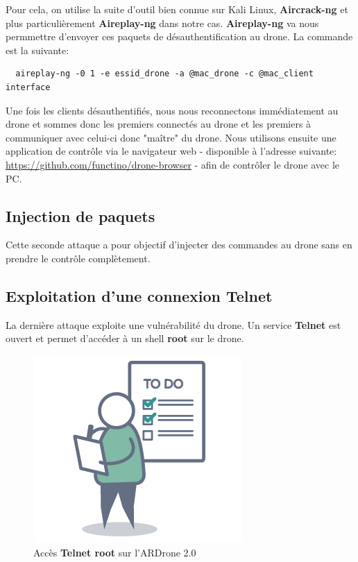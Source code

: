 Pour cela, on utilise la suite d'outil bien connue sur Kali Linux, \textbf{Aircrack-ng} et plus particulièrement \textbf{Aireplay-ng} dans notre cas. \textbf{Aireplay-ng} va nous permmettre d'envoyer ces paquets de désauthentification au drone.
La commande est la suivante:
\begin{verbatim}
  aireplay-ng -0 1 -e essid_drone -a @mac_drone -c @mac_client interface
\end{verbatim}


Une fois les clients désauthentifiés, nous nous reconnectons immédiatement au drone et sommes donc les premiers connectés au drone et les premiers à communiquer avec celui-ci donc "maître" du drone. Nous utilisons ensuite une application de contrôle via le navigateur web - disponible à l'adresse suivante: \url{https://github.com/functino/drone-browser} - afin de contrôler le drone avec le PC.

\subsection{Injection de paquets}
Cette seconde attaque a pour objectif d'injecter des commandes au drone sans en prendre le contrôle complètement.

\subsection{Exploitation d'une connexion Telnet}
La dernière attaque exploite une vulnérabilité du drone. Un service \textbf{Telnet} est ouvert et permet d'accéder à un shell \textbf{root} sur le drone.

\begin{figure}[H]
  \centering
  \includegraphics[scale=0.3]{images/todo.png}
  \caption{Accès \textbf{Telnet root} sur l'ARDrone 2.0}
\end{figure}

